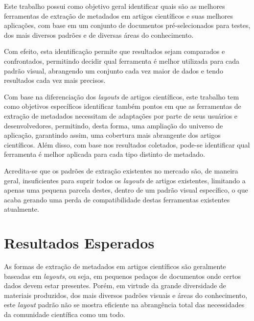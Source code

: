 Este trabalho possui como objetivo geral identificar quais são as melhores ferramentas de extração de metadados em artigos científicos e suas melhores aplicações, com base em um conjunto de documentos pré-selecionados para testes, dos mais diversos padrões e de diversas áreas do conhecimento.

Com efeito, esta identificação permite que resultados sejam comparados e confrontados, permitindo decidir qual ferramenta é melhor utilizada para cada padrão visual, abrangendo um conjunto cada vez maior de dados e tendo resultados cada vez mais precisos.



Com base na diferenciação dos \textit{layouts} de artigos científicos, este trabalho tem como objetivos específicos identificar também pontos em que as ferramentas de extração de metadados necessitam de adaptações por parte de seus usuários e desenvolvedores, permitindo, desta forma, uma ampliação do universo de aplicação, garantindo assim, uma cobertura mais abrangente dos artigos científicos. Além disso, com base nos resultados coletados, pode-se identificar qual ferramenta é melhor aplicada para cada tipo distinto de metadado.

Acredita-se que os padrões de extração existentes no mercado são, de maneira geral, insuficientes para suprir todos os \emph{layouts} de artigos existentes, limitando a apenas uma pequena parcela destes, dentro de um padrão visual específico, o que acaba gerando uma perda de compatibilidade destas ferramentas existentes atualmente.


\section{Resultados Esperados}
\label{sec:expected-results}

As formas de extração de metadados em artigos científicos são geralmente baseadas em \textit{layouts}, ou seja, em pequenos pedaços de documentos onde certos dados devem estar presentes. Porém, em virtude da grande diversidade de materiais produzidos, dos mais diversos padrões visuais e áreas do conhecimento, este \textit{layout} padrão não se mostra eficiente na abrangência total das necessidades da comunidade científica como um todo. 

